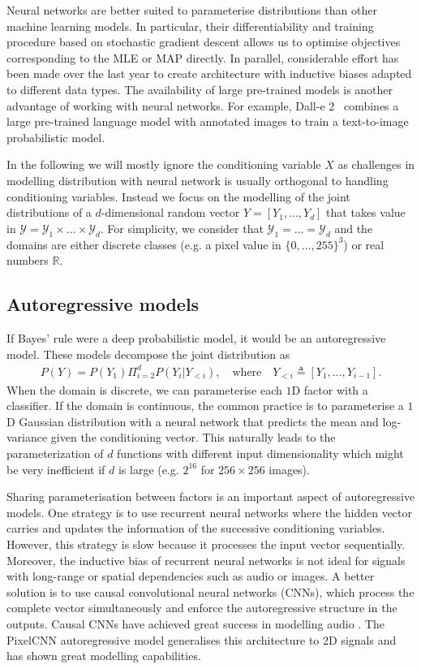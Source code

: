 Neural networks are better suited to parameterise distributions than other machine learning models. In particular, their differentiability and training procedure based on stochastic gradient descent allows us to optimise objectives corresponding to the MLE or MAP directly. In parallel, considerable effort has been made over the last year to create architecture with inductive biases adapted to different data types. The availability of large pre-trained models is another advantage of working with neural networks. For example, Dall-e 2~\citep{ramesh2022hierarchical} combines a large pre-trained language model with annotated images to train a text-to-image probabilistic model.

In the following we will mostly ignore the conditioning variable $X$ as challenges in modelling distribution with neural network is usually orthogonal to handling conditioning variables. Instead we focus on the modelling of the joint distributions of a $d$-dimensional random vector $Y = \left[Y_1, \dots, Y_d  \right]$ that takes value in $\mathcal{Y} = \mathcal{Y}_1 \times \dots \times \mathcal{Y}_d$. For simplicity, we consider that $\mathcal{Y}_1 = \dots = \mathcal{Y}_d$ and the domains are either discrete classes (e.g. a pixel value in $\{0, \dots, 255\}^3$) or real numbers $\mathbb{R}$.
\subsection{Autoregressive models} \label{subsec:AM}
If Bayes' rule were a deep probabilistic model, it would be an autoregressive model. These models decompose the joint distribution as
\begin{align}
  P(Y) = P(Y_1) \Pi^d_{i=2} P(Y_i|Y_{<i}), \quad \text{where} \quad Y_{<i} \triangleq \left[ Y_1, \dots, Y_{i-1}\right].
\end{align}
When the domain is discrete, we can parameterise each $1$D factor with a classifier. If the domain is continuous, the common practice is to parameterise a $1$D Gaussian distribution with a neural network that predicts the mean and log-variance given the conditioning vector.
This naturally leads to the parameterization of $d$ functions with different input dimensionality which might be very inefficient if $d$ is large (e.g. $2^16$ for $256\times256$ images).

Sharing parameterisation between factors is an important aspect of autoregressive models. One strategy is to use recurrent neural networks where the hidden vector carries and updates the information of the successive conditioning variables\citep{van2016pixel}. However, this strategy is slow because it processes the input vector sequentially. Moreover, the inductive bias of recurrent neural networks is not ideal for signals with long-range or spatial dependencies such as audio or images. A better solution is to use causal convolutional neural networks (CNNs), which process the complete vector simultaneously and enforce the autoregressive structure in the outputs. Causal CNNs have achieved great success in modelling audio \citep{van_den_oord_wavenet_2016, van_den_oord_parallel_2018}. The PixelCNN autoregressive model generalises this architecture to 2D signals and has shown great modelling capabilities\citep{oord_conditional_2016}.

